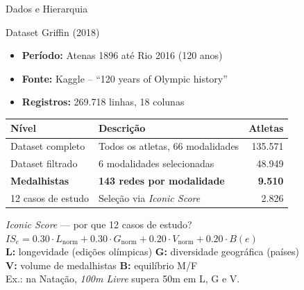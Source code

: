 \begin{frame}[shrink=8]{Dados e Hierarquia}
    \begin{block}{Dataset Griffin (2018) \cite{Griffin2018OlympicDataset}}
        \begin{itemize}
            \item \textbf{Período:} Atenas 1896 até Rio 2016 (120 anos)
            \item \textbf{Fonte:} Kaggle -- ``120 years of Olympic history''
            \item \textbf{Registros:} 269.718 linhas, 18 colunas
        \end{itemize}
    \end{block}

    \vspace{0.15cm}

    \begin{table}
    \centering
    \scriptsize
    \begin{tabular}{p{3cm}p{5cm}r}
    \toprule
    \textbf{Nível} & \textbf{Descrição} & \textbf{Atletas} \\
    \midrule
    Dataset completo & Todos os atletas, 66 modalidades & 135.571 \\
    Dataset filtrado & 6 modalidades selecionadas & 48.949 \\
    \textbf{Medalhistas} & \textbf{143 redes por modalidade} & \textbf{9.510} \\
    12 casos de estudo & Seleção via \textit{Iconic Score} & 2.826 \\
    \bottomrule
    \end{tabular}
    \end{table}

    \vspace{0.1cm}

    \begin{block}{\textit{Iconic Score} \cite{TCCRepositorio2025} --- por que 12 casos de estudo?}
        \footnotesize
        $IS_e = 0.30 \cdot L_{\text{norm}} + 0.30 \cdot G_{\text{norm}} + 0.20 \cdot V_{\text{norm}} + 0.20 \cdot B(e)$\\[0.1cm]
        \textbf{L:} longevidade (edições olímpicas) \quad \textbf{G:} diversidade geográfica (países)\\
        \textbf{V:} volume de medalhistas \quad \textbf{B:} equilíbrio M/F\\[0.1cm]
        Ex.: na Natação, \textit{100m Livre} supera 50m em L, G e V.
    \end{block}
\end{frame}

